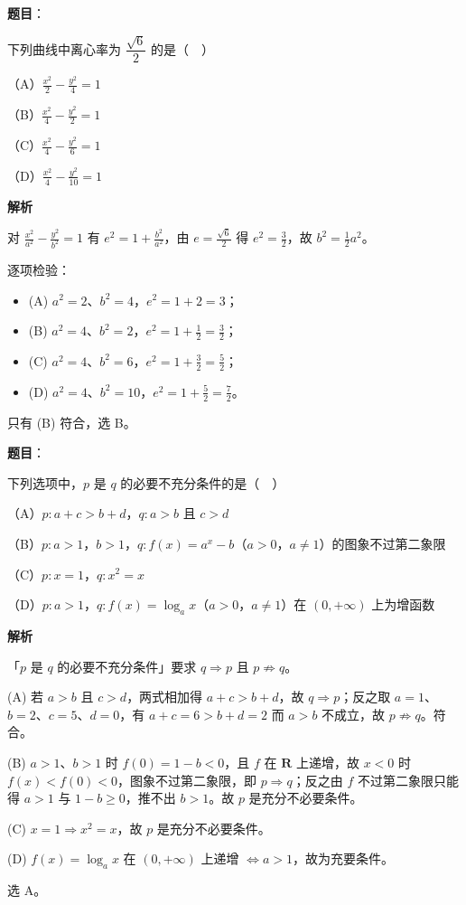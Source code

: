 \begin{answer}

\textbf{题目}：

下列曲线中离心率为 $\dfrac{\sqrt6}{2}$ 的是（　）

（A）$\frac{x^2}{2}-\frac{y^2}{4}=1$

（B）$\frac{x^2}{4}-\frac{y^2}{2}=1$

（C）$\frac{x^2}{4}-\frac{y^2}{6}=1$

（D）$\frac{x^2}{4}-\frac{y^2}{10}=1$

\textbf{解析}

对 $\frac{x^2}{a^2}-\frac{y^2}{b^2}=1$ 有 $e^2=1+\frac{b^2}{a^2}$，由 $e=\frac{\sqrt6}{2}$ 得 $e^2=\frac32$，故 $b^2=\frac12a^2$。

逐项检验：

\begin{itemize}
\item (A) $a^2=2$、$b^2=4$，$e^2=1+2=3$；
\item (B) $a^2=4$、$b^2=2$，$e^2=1+\frac12=\frac32$；
\item (C) $a^2=4$、$b^2=6$，$e^2=1+\frac32=\frac52$；
\item (D) $a^2=4$、$b^2=10$，$e^2=1+\frac52=\frac72$。
\end{itemize}

只有 (B) 符合，选 B。


\end{answer}
\begin{answer}

\textbf{题目}：

下列选项中，$p$ 是 $q$ 的必要不充分条件的是（　）

（A）$p:a+c>b+d$，$q:a>b$ 且 $c>d$

（B）$p:a>1$，$b>1$，$q:f(x)=a^x-b$（$a>0$，$a\neq1$）的图象不过第二象限

（C）$p:x=1$，$q:x^2=x$

（D）$p:a>1$，$q:f(x)=\log_a x$（$a>0$，$a\neq1$）在 $(0,+\infty)$ 上为增函数

\textbf{解析}

「$p$ 是 $q$ 的必要不充分条件」要求 $q\Rightarrow p$ 且 $p\not\Rightarrow q$。

(A) 若 $a>b$ 且 $c>d$，两式相加得 $a+c>b+d$，故 $q\Rightarrow p$；反之取 $a=1$、$b=2$、$c=5$、$d=0$，有 $a+c=6>b+d=2$ 而 $a>b$ 不成立，故 $p\not\Rightarrow q$。符合。

(B) $a>1$、$b>1$ 时 $f(0)=1-b<0$，且 $f$ 在 $\mathbf R$ 上递增，故 $x<0$ 时 $f(x)<f(0)<0$，图象不过第二象限，即 $p\Rightarrow q$；反之由 $f$ 不过第二象限只能得 $a>1$ 与 $1-b\geqslant0$，推不出 $b>1$。故 $p$ 是充分不必要条件。

(C) $x=1\Rightarrow x^2=x$，故 $p$ 是充分不必要条件。

(D) $f(x)=\log_a x$ 在 $(0,+\infty)$ 上递增 $\iff a>1$，故为充要条件。

选 A。


\end{answer}
